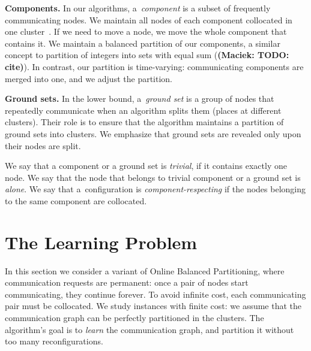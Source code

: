 \documentclass[manuscript,screen=true, review, anonymous]{acmart}
\newcommand\maciek[1]{\color{brown}\textbf{(Maciek: #1)}\color{black}}
\begin{document}
\noindent
\textbf{Components.}
In our algorithms, a~\emph{component} is a subset of frequently communicating nodes.
We maintain all nodes of each component collocated in one cluster~\cite{repartition-disc}.
If we need to move a node, we move the whole component that contains it.
We maintain a balanced partition of our components, a similar concept to partition of integers into sets with equal sum (\maciek{TODO: cite}).
In contrast, our partition is time-varying: communicating components are merged into one, and we adjust the partition.

\noindent
\textbf{Ground sets.}
In the lower bound, a~\emph{ground set} is a group of nodes that repeatedly communicate when an algorithm splits them (places at different clusters).
Their role is to ensure that the algorithm maintains a partition of ground sets into clusters.
We emphasize that ground sets are revealed only upon their nodes are split.


We say that a component or a ground set is \emph{trivial}, if it contains exactly one node.
We say that the node that belongs to trivial component or a ground set is \emph{alone}.
We say that a~configuration is \emph{component-respecting}
if the nodes belonging to the same component are collocated.



\section{The Learning Problem} %

In this section we consider a variant of Online Balanced Partitioning, where communication requests are permanent: once a pair of nodes start communicating, they continue forever.
To avoid infinite cost, each communicating pair must be collocated.
We study instances with finite cost: we assume that the communication graph can be perfectly partitioned in the clusters.
The algorithm's goal is to \emph{learn} the communication graph, and partition it without too many reconfigurations.
\end{document}
